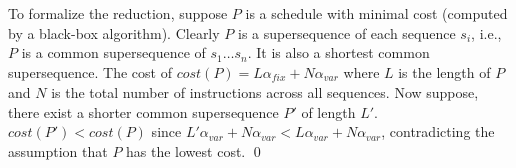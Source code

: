 To formalize the reduction, suppose $P$ is a schedule with minimal cost (computed by a black-box algorithm). 
Clearly $P$ is a supersequence of each sequence $s_i$, i.e., $P$ is a common supersequence of $s_1 \dots s_n$. It is also a shortest common supersequence. 
The cost of $\mathit{cost}(P) = L\alpha_\mathit{fix}+N\alpha_\mathit{var}$ where $L$ is the length of $P$ and $N$ is the total number of instructions across all sequences. %
Now suppose, there exist a shorter common supersequence $P'$ of length $L'$. $\mathit{cost}(P') < \mathit{cost}(P)$ since $L'\alpha_\mathit{var} + N\alpha_\mathit{var} < L\alpha_\mathit{var} + N\alpha_\mathit{var}$, contradicting the assumption that $P$ has the lowest cost. \qed

